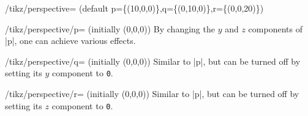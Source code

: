\begin{key}{/tikz/perspective=
    (default p=\{(10,0,0)\},q=\{(0,10,0)\},r=\{(0,0,20)\})}
\begin{key}{/tikz/perspective/p= (initially (0,0,0))}
    By changing the $y$ and $z$ components of |p|, one can achieve various
    effects.
\begin{codeexample}[preamble={\usetikzlibrary{perspective}}]
\end{codeexample}
\begin{codeexample}[preamble={\usetikzlibrary{perspective}}]
\end{codeexample}
\begin{codeexample}[preamble={\usetikzlibrary{perspective}}]
\end{codeexample}
  \end{key}
  \begin{key}{/tikz/perspective/q= (initially (0,0,0))}
    Similar to |p|, but can be turned off by setting its $y$ component to
    \texttt{0}.
\begin{codeexample}[preamble={\usetikzlibrary{perspective}}]
\end{codeexample}
  \end{key}
  \begin{key}{/tikz/perspective/r= (initially (0,0,0))}
    Similar to |p|, but can be turned off by setting its $z$ component to
    \texttt{0}.
\begin{codeexample}[preamble={\usetikzlibrary{perspective}}]
\end{codeexample}
  \end{key}
\end{key}


